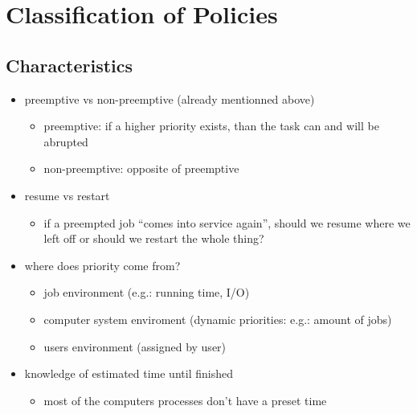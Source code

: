 \documentclass[11pt]{report}
\begin{document}
\chapter{Classification of Policies}
\label{sec:org3ff5e09}
\section{Characteristics}
\label{sec:org0b5c812}
\begin{itemize}
\item preemptive vs non-preemptive (already mentionned above)
\begin{itemize}
\item preemptive: if a higher priority exists, than the task can and will be abrupted
\item non-preemptive: opposite of preemptive
\end{itemize}
\item resume vs restart
\begin{itemize}
\item if a preempted job ``comes into service again'', should we resume where we left off or should we restart the whole thing?
\end{itemize}
\item where does priority come from?
\begin{itemize}
\item job environment (e.g.: running time, I/O)
\item computer system enviroment (dynamic priorities: e.g.: amount of jobs)
\item users environment (assigned by user)
\end{itemize}
\item knowledge of estimated time until finished
\begin{itemize}
\item most of the computers processes don't have a preset time
\end{itemize}
\end{itemize}
\end{document}
